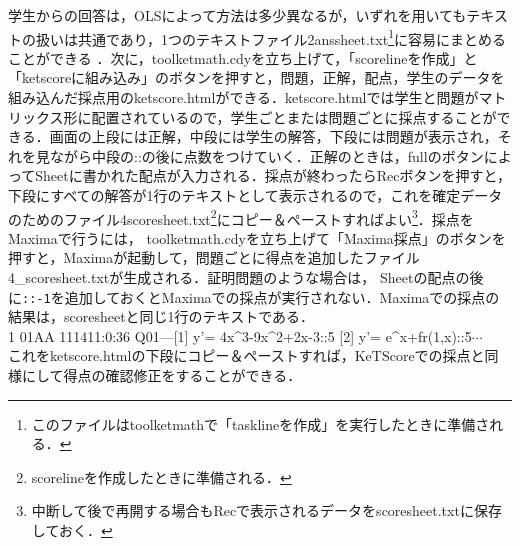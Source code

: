 \documentclass[a4j,12pt]{ujarticle}
\begin{document}
学生からの回答は，OLSによって方法は多少異なるが，いずれを用いてもテキストの扱いは共通であり，1つのテキストファイル2anssheet.txt\footnote{このファイルはtoolketmathで「tasklineを作成」を実行したときに準備される．}に容易にまとめることができる ．次に，toolketmath.cdyを立ち上げて，「scorelineを作成」と「ketscoreに組み込み」のボタンを押すと，問題，正解，配点，学生のデータを組み込んだ採点用のketscore.htmlができる．ketscore.htmlでは学生と問題がマトリックス形に配置されているので，学生ごとまたは問題ごとに採点することができる．画面の上段には正解，中段には学生の解答，下段には問題が表示され，それを見ながら中段の::の後に点数をつけていく．正解のときは，fullのボタンによってSheetに書かれた配点が入力される．採点が終わったらRecボタンを押すと，下段にすべての解答が1行のテキストとして表示されるので，これを確定データのためのファイル4scoresheet.txt\footnote{scorelineを作成したときに準備される．}にコピー＆ペーストすればよい\footnote{中断して後で再開する場合もRecで表示されるデータをscoresheet.txtに保存しておく．}．採点をMaximaで行うには，
toolketmath.cdyを立ち上げて「Maxima採点」のボタンを押すと，Maximaが起動して，問題ごとに得点を追加したファイル%
4\_scoresheet.txtが生成される．証明問題のような場合は，
Sheetの配点の後に\verb|::-1|を追加しておくとMaximaでの採点が実行されない．Maximaでの採点の結果は，scoresheetと同じ1行のテキストである．\\
\hspace*{2zw}%
1 01AA 111411:0:36 Q01---[1] y'=  4x\^{}3-9x\^{}2+2x-3::5 [2] y'=  e\^{}x+fr(1,x)::5$\cdots$\\
これをketscore.htmlの下段にコピー＆ペーストすれば，KeTScoreでの採点と同様にして得点の確認修正をすることができる．
\end{document}

